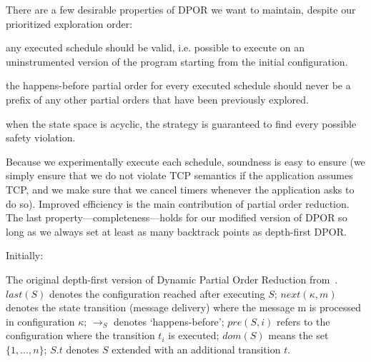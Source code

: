 There are a few desirable properties of DPOR we want to maintain,
despite our prioritized exploration order:

 any executed schedule should be valid, i.e. possible
to execute on an uninstrumented version of the program starting from the
initial configuration.

 the happens-before partial order for every executed schedule
should never be a prefix of any other partial orders that have been
previously explored.

 when the state space is acyclic, the strategy is guaranteed to
find every possible safety violation.

Because we experimentally execute each schedule, soundness is easy to
ensure (we simply ensure that we do not violate TCP semantics if the application
assumes TCP, and we make sure that
we cancel timers whenever the application asks to do so).
Improved efficiency is the main contribution of partial order reduction. The last
property---completeness---holds for our modified version of DPOR so long as we
always set at least as many backtrack points as depth-first
DPOR.

\begin{algorithm*}[tb!]
\begin{algorithmic}
\State Initially: 
\Else
{}
\EndIf
\EndIf
\EndFor

\EndWhile
\EndIf

\EndProcedure
\end{algorithmic}
\caption{{\label{alg:dpor} The original depth-first version of Dynamic Partial Order Reduction
from~\cite{flanagan2005dynamic}. $last(S)$ denotes the configuration reached
after executing $S$;
$next(\kappa,m)$ denotes the state transition (message delivery) where the message m is
processed in configuration $\kappa$; $\rightarrow_S$ denotes `happens-before';
$pre(S,i)$ refers to the configuration where the transition $t_i$ is executed; $dom(S)$ means the set
$\{1,\dots,n\}$; $S.t$ denotes
$S$ extended with an additional transition $t$.}}
\end{algorithm*}


